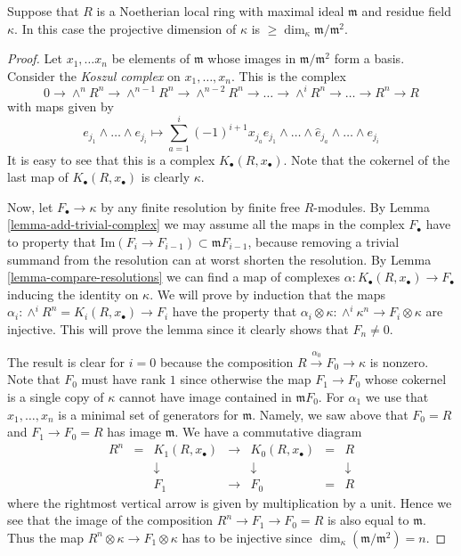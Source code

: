 \begin{lemma}
\label{lemma-length-resolution-residue-field}
Suppose that $R$ is a Noetherian local ring
with maximal ideal $\mathfrak m$ and
residue field $\kappa$. In this case
the projective dimension of $\kappa$ is
$\geq \dim_\kappa \mathfrak m / \mathfrak m^2$.
\end{lemma}

\begin{proof}
Let $x_1 , \ldots x_n$ be elements of $\mathfrak m$
whose images in $\mathfrak m / \mathfrak m^2$ form a basis.
Consider the {\it Koszul complex} on $x_1, \ldots, x_n$.
This is the complex
$$
0 \to \wedge^n R^n \to \wedge^{n-1} R^n \to \wedge^{n-2} R^n \to
\ldots \to \wedge^i R^n \to \ldots \to R^n \to R
$$
with maps given by
$$
e_{j_1} \wedge \ldots \wedge e_{j_i}
\longmapsto
\sum_{a = 1}^i (-1)^{i + 1} x_{j_a} e_{j_1} \wedge \ldots
\wedge \hat e_{j_a} \wedge \ldots \wedge e_{j_i}
$$
It is easy to see that this is a complex $K_{\bullet}(R, x_{\bullet})$.
Note that the cokernel of the last map of $K_{\bullet}(R, x_{\bullet})$
is clearly $\kappa$.

\medskip\noindent
Now, let $F_{\bullet} \to \kappa$ by any finite resolution by
finite free $R$-modules. By Lemma \ref{lemma-add-trivial-complex}
we may assume all the maps in the complex $F_{\bullet}$
have to property that $\text{Im}(F_i \to F_{i-1})
\subset \mathfrak m F_{i-1}$, because removing a trivial
summand from the resolution can at worst shorten the resolution.
By Lemma \ref{lemma-compare-resolutions} we can find a map
of complexes $\alpha : K_{\bullet}(R, x_{\bullet}) \to F_{\bullet}$
inducing the identity on $\kappa$. We will prove by induction
that the maps $\alpha_i : \wedge^i R^n = K_i(R, x_{\bullet}) \to F_i$
have the property that $\alpha_i \otimes \kappa
: \wedge^i \kappa^n \to F_i \otimes \kappa$ are injective.
This will prove the lemma since it clearly shows that
$F_n \not = 0$.

\medskip\noindent
The result is clear for $i = 0$ because the composition
$R \xrightarrow{\alpha_0} F_0 \to \kappa$ is nonzero.
Note that $F_0$ must have rank $1$ since
otherwise the map $F_1 \to F_0$ whose cokernel is a single
copy of $\kappa$ cannot have image contained in $\mathfrak m F_0$.
For $\alpha_1$ we use that $x_1, \ldots, x_n$ is a minimal
set of generators for $\mathfrak m$. Namely, we saw above that
$F_0 = R$ and $F_1 \to F_0 = R$ has image $\mathfrak m$.
We have a commutative diagram
$$
\begin{matrix}
R^n & = & K_1(R, x_{\bullet}) & \to & K_0(R, x_{\bullet}) & = & R \\
& & \downarrow & & \downarrow & & \downarrow \\
& & F_1 & \to & F_0 & = & R
\end{matrix}
$$
where the rightmost vertical arrow is given by multiplication
by a unit. Hence we see that the image of the composition
$R^n \to F_1 \to F_0 = R$ is also equal to $\mathfrak m$.
Thus the map $R^n \otimes \kappa \to F_1 \otimes \kappa$
has to be injective since $\dim_\kappa (\mathfrak m / \mathfrak m^2) = n$.


\end{proof}
